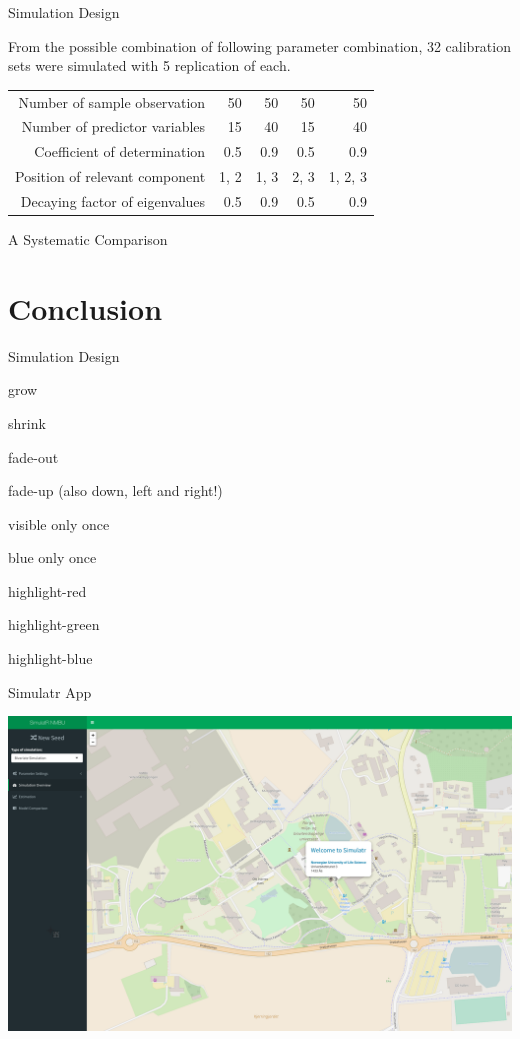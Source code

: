 \documentclass[ignorenonframetext,]{beamer}
\begin{document}
\begin{frame}{Simulation Design}

From the possible combination of following parameter combination, 32
calibration sets were simulated with 5 replication of each.

\begin{longtable}[]{@{}rrrrr@{}}
\toprule
Number of sample observation & 50 & 50 & 50 & 50\tabularnewline
Number of predictor variables & 15 & 40 & 15 & 40\tabularnewline
Coefficient of determination & 0.5 & 0.9 & 0.5 & 0.9\tabularnewline
Position of relevant component & 1, 2 & 1, 3 & 2, 3 & 1, 2,
3\tabularnewline
Decaying factor of eigenvalues & 0.5 & 0.9 & 0.5 & 0.9\tabularnewline
\bottomrule
\end{longtable}

\end{frame}

\begin{frame}{A Systematic Comparison}

\end{frame}

\section{Conclusion}\label{conclusion}

\begin{frame}{Simulation Design}

grow

shrink

fade-out

fade-up (also down, left and right!)

visible only once

blue only once

highlight-red

highlight-green

highlight-blue

\end{frame}

\begin{frame}{Simulatr App}

\includegraphics[width=0.8\linewidth]{images/simulatr-screenshot}

\end{frame}
\end{document}
